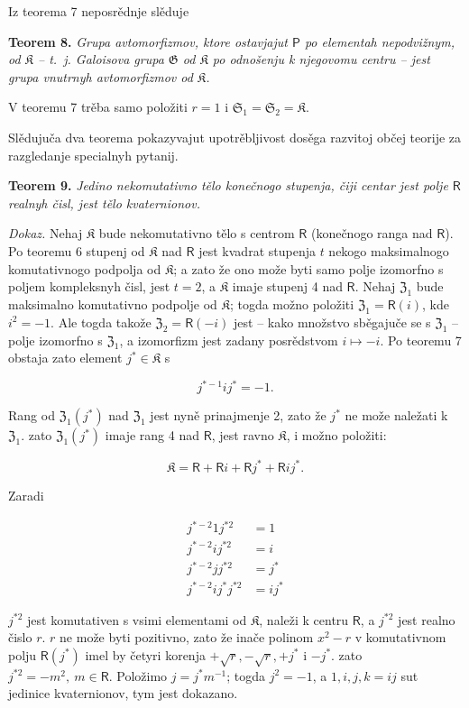 \documentclass[11pt]{article}
\begin{document}
Iz teorema 7 neposrědnje slěduje

\textbf{Teorem 8.} \emph{Grupa avtomorfizmov, ktore ostavjajut \(\mathsf P\) po elementah nepodvižnym, od \(\mathfrak K\) -- t.~j. Galoisova grupa \(\mathfrak G\) od \(\mathfrak K\) po odnošenju k njegovomu centru -- jest grupa vnutrnyh avtomorfizmov od \(\mathfrak K\).}

V teoremu 7 trěba samo položiti \(r=1\) i \(\mathfrak S_1=\mathfrak S_2=\mathfrak K\).

Slědujuča dva teorema pokazyvajut upotrěbljivost dosěga razvitoj občej teorije za razgledanje specialnyh pytanij.

\textbf{Teorem 9.} \emph{Jedino nekomutativno tělo konečnogo stupenja, čiji centar jest polje \(\mathsf{R}\) realnyh čisl, jest tělo kvaternionov.}

\emph{Dokaz.} Nehaj \(\mathfrak K\) bude nekomutativno tělo s centrom \(\mathsf{R}\) (konečnogo ranga nad \(\mathsf{R}\)). Po teoremu 6 stupenj od \(\mathfrak K\) nad \(\mathsf{R}\) jest kvadrat stupenja \(t\) nekogo maksimalnogo komutativnogo podpolja od \(\mathfrak K\); a zato že ono može byti samo polje izomorfno s poljem kompleksnyh čisl, jest \(t=2\), a \(\mathfrak K\) imaje stupenj 4 nad \(\mathsf{R}\). Nehaj \(\mathfrak Z_1\) bude maksimalno komutativno podpolje od \(\mathfrak K\); togda možno položiti \(\mathfrak Z_1=\mathsf{R}(i)\), kde \(i^2=-1\). Ale togda takože \(\mathfrak Z_2=\mathsf{R}(-i)\) jest -- kako množstvo sběgajuče se s \(\mathfrak Z_1\) -- polje izomorfno s \(\mathfrak Z_1\), a izomorfizm jest zadany posrědstvom \(i\mapsto -i\). Po teoremu 7 obstaja zato element \(j^*\in\mathfrak K\) s

\[
j^{*-1}ij^*=-1.
\]

Rang od \(\mathfrak Z_1(j^*)\) nad \(\mathfrak Z_1\) jest nyně prinajmenje 2, zato že \(j^*\) ne može naležati k \(\mathfrak Z_1\). zato \(\mathfrak Z_1(j^*)\) imaje rang 4 nad \(\mathsf{R}\), jest ravno \(\mathfrak K\), i možno položiti:

\[
\mathfrak K=\mathsf R+\mathsf Ri+\mathsf Rj^*+\mathsf Rij^*.
\]

Zaradi

\[
\begin{aligned}
j^{*-2}1j^{*2}&=1\\
j^{*-2}ij^{*2}&=i\\
j^{*-2}jj^{*2}&=j^*\\
j^{*-2}ij^*j^{*2}&=ij^*
\end{aligned}
\]

\(j^{*2}\) jest komutativen s vsimi elementami od \(\mathfrak K\), naleži k centru \(\mathsf{R}\), a \(j^{*2}\) jest realno čislo \(r\). \(r\) ne može byti pozitivno, zato že inače polinom \(x^2-r\) v komutativnom polju \(\mathsf{R}(j^*)\) imel by četyri korenja \(+\sqrt r,-\sqrt r,+j^*\) i \(-j^*\). zato \(j^{*2}=-m^2,\ m\in \mathsf{R}\). Položimo \(j=j^*m^{-1}\); togda \(j^2=-1\), a \(1,i,j,k=ij\) sut jedinice kvaternionov, tym jest dokazano.
\end{document}
